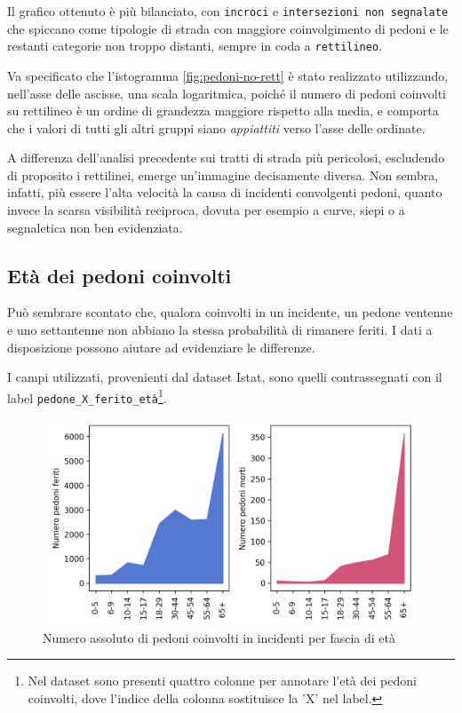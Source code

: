 \documentclass[a4paper]{report}
\newcommand{\columnstyle}[1]{\texttt{#1}}
\newcommand{\quotestyle}[1]{\textit{#1}}
\begin{document}
Il grafico ottenuto è più bilanciato, con \columnstyle{incroci} e 
\columnstyle{intersezioni non segnalate} che spiccano come tipologie di strada con 
maggiore coinvolgimento di pedoni e le restanti categorie non troppo distanti, 
sempre in coda a \columnstyle{rettilineo}. 

Va specificato che l'istogramma \ref{fig:pedoni-no-rett} è stato realizzato utilizzando, 
nell'asse delle ascisse, una scala logaritmica, poiché il numero di pedoni coinvolti 
su rettilineo è un ordine di grandezza maggiore rispetto alla media, e 
comporta che i valori di tutti gli altri gruppi siano \quotestyle{appiattiti} 
verso l'asse delle ordinate. 

A differenza dell'analisi precedente sui tratti di strada più pericolosi, 
escludendo di proposito i rettilinei, emerge un'immagine decisamente diversa. 
Non sembra, infatti, più essere l'alta velocità la causa di incidenti convolgenti pedoni, 
quanto invece la scarsa visibilità reciproca, dovuta per esempio a curve, siepi o a 
segnaletica non ben evidenziata.


\subsection{Età dei pedoni coinvolti}

Può sembrare scontato che, qualora coinvolti in un incidente, un pedone ventenne e 
uno settantenne non abbiano la stessa probabilità di rimanere feriti. 
I dati a disposizione possono aiutare ad evidenziare le differenze.

I campi utilizzati, provenienti dal dataset Istat, sono quelli contrassegnati 
con il label 
\columnstyle{pedone\_X\_ferito\_età}\footnote{Nel dataset sono presenti quattro colonne per 
annotare l'età dei pedoni coinvolti, dove l'indice della colonna sostituisce la 'X' nel label.}. 

\begin{figure}
    \includegraphics[width=\linewidth]{../src/incidenti/incidenti_senza_coords/pedoni/eta_pedoni_iniziale.png}
    \caption{Numero assoluto di pedoni coinvolti in incidenti per fascia di età}
    \label{fig:eta-pedoni-iniziale}
\end{figure}
\end{document}
